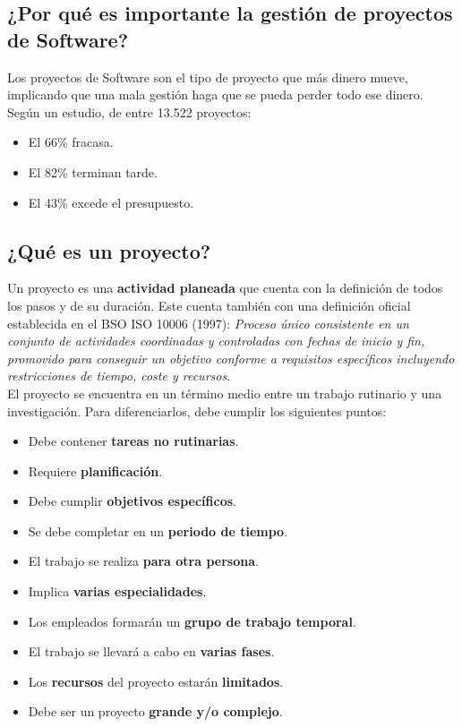 \documentclass[12pt]{article}
\begin{document}
\subsection{¿Por qué es importante la gestión de proyectos de Software?}
\label{1.2.0}

{Los proyectos de Software son el tipo de proyecto que más dinero mueve, implicando que una mala gestión haga que se pueda perder todo ese dinero. Según un estudio, de entre 13.522 proyectos:}

\begin{itemize}
    \item {El 66\% fracasa.}
    \item {El 82\% terminan tarde.}
    \item {El 43\% excede el presupuesto.}
\end{itemize}

\subsection{¿Qué es un proyecto?}
\label{1.3.0}

{Un proyecto es una \textbf{actividad planeada} que cuenta con la definición de todos los pasos y de su duración. Este cuenta también con una definición oficial establecida en el BSO ISO 10006 (1997): \textit{Proceso único consistente en un conjunto de actividades coordinadas y controladas con fechas de inicio y fin, promovido para conseguir un objetivo conforme a requisitos específicos incluyendo restricciones de tiempo, coste y recursos}.} \\

{El proyecto se encuentra en un término medio entre un trabajo rutinario y una investigación. Para diferenciarlos, debe cumplir los siguientes puntos:}

\begin{itemize}
    \item {Debe contener \textbf{tareas no rutinarias}.}
    \item {Requiere \textbf{planificación}.}
    \item {Debe cumplir \textbf{objetivos específicos}.}
    \item {Se debe completar en un \textbf{periodo de tiempo}.}
    \item {El trabajo se realiza \textbf{para otra persona}.}
    \item {Implica \textbf{varias especialidades}.}
    \item {Los empleados formarán un \textbf{grupo de trabajo temporal}.}
    \item {El trabajo se llevará a cabo en \textbf{varias fases}.}
    \item {Los \textbf{recursos} del proyecto estarán \textbf{limitados}.}
    \item {Debe ser un proyecto \textbf{grande y/o complejo}.}
\end{itemize}
\end{document}
